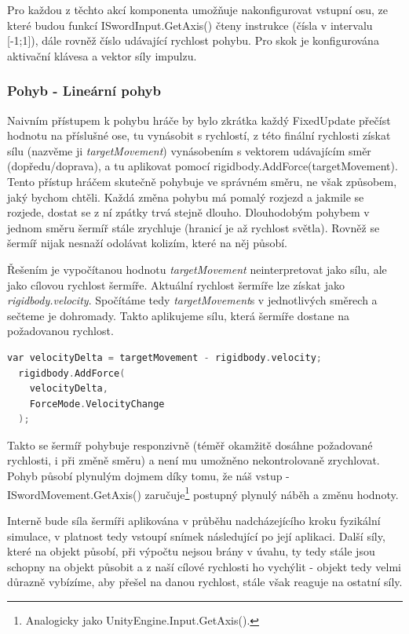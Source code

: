 Pro každou z těchto akcí komponenta umožňuje nakonfigurovat vstupní osu, ze které budou funkcí ISwordInput.GetAxis() čteny instrukce (čísla v intervalu [-1;1]), dále rovněž číslo udávající rychlost pohybu. Pro skok je konfigurována aktivační klávesa a vektor síly impulzu.

\subsubsection*{Pohyb - Lineární pohyb}

Naivním přístupem k pohybu hráče by bylo zkrátka každý FixedUpdate přečíst hodnotu na příslušné ose, tu vynásobit s rychlostí, z této finální rychlosti získat sílu (nazvěme ji \textit{targetMovement}) vynásobením s vektorem udávajícím směr (dopředu/doprava), a tu aplikovat pomocí rigidbody.AddForce(targetMovement).
Tento přístup hráčem skutečně pohybuje ve správném směru, ne však způsobem, jaký bychom chtěli. Každá změna pohybu má pomalý rozjezd a jakmile se rozjede, dostat se z ní zpátky trvá stejně dlouho. Dlouhodobým pohybem v jednom směru šermíř stále zrychluje (hranicí je až rychlost světla). Rovněž se šermíř nijak nesnaží odolávat kolizím, které na něj působí. 

Řešením je vypočítanou hodnotu \textit{targetMovement} neinterpretovat jako sílu, ale jako cílovou rychlost šermíře. Aktuální rychlost šermíře lze získat jako \textit{rigidbody.velocity}. Spočítáme tedy \textit{targetMovement}s v jednotlivých směrech a sečteme je dohromady. Takto aplikujeme sílu, která šermíře dostane na požadovanou rychlost. 

\begin{lstlisting}[language=C, basicstyle=\fontsize{11}{13}\selectfont\ttfamily]
  var velocityDelta = targetMovement - rigidbody.velocity;
  rigidbody.AddForce(
    velocityDelta,
    ForceMode.VelocityChange
  );
\end{lstlisting}


Takto se šermíř pohybuje responzivně (téměř okamžitě dosáhne požadované rychlosti, i při změně směru) a není mu umožněno nekontrolovaně zrychlovat. Pohyb působí plynulým dojmem díky tomu, že náš vstup - ISwordMovement.GetAxis() zaručuje\footnote{Analogicky jako UnityEngine.Input.GetAxis().} postupný plynulý náběh a změnu hodnoty.

Interně bude síla šermíři aplikována v průběhu nadcházejícího kroku fyzikální simulace, v platnost tedy vstoupí snímek následující po její aplikaci. Další síly, které na objekt působí, při výpočtu nejsou brány v úvahu, ty tedy stále jsou schopny na objekt působit a z naší cílové rychlosti ho vychýlit - objekt tedy velmi důrazně vybízíme, aby přešel na danou rychlost, stále však reaguje na ostatní síly. 

